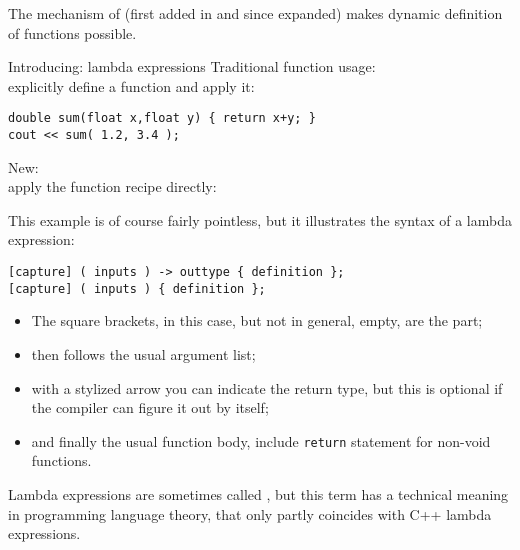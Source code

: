 
The mechanism of 
(first added in  and since expanded)
makes dynamic definition of functions possible.

\begin{block}{Introducing: lambda expressions}
  \label{sl:lambda-example}
  Traditional function usage:\\
  explicitly define a function and apply it:
\begin{lstlisting}
double sum(float x,float y) { return x+y; }
cout << sum( 1.2, 3.4 );
\end{lstlisting}
New:\\
apply the function recipe directly:
\end{block}

This example is of course fairly pointless,
but it illustrates the syntax of a lambda expression:
\begin{lstlisting}
[capture] ( inputs ) -> outtype { definition };
[capture] ( inputs ) { definition };  
\end{lstlisting}

\begin{itemize}
\item The square brackets, in this case, but not in general, empty,
  are the  part;
\item then follows the usual argument list;
\item with a stylized arrow you can indicate the return type,
  but this is optional if the compiler can figure it out by itself;
\item and finally the usual function body, include \lstinline{return} statement
  for non-void functions.
\end{itemize}

\begin{remark}
  Lambda expressions are sometimes called ,
  but this term has a technical meaning in programming language theory,
  that only partly coincides with C++ lambda expressions.
\end{remark}

